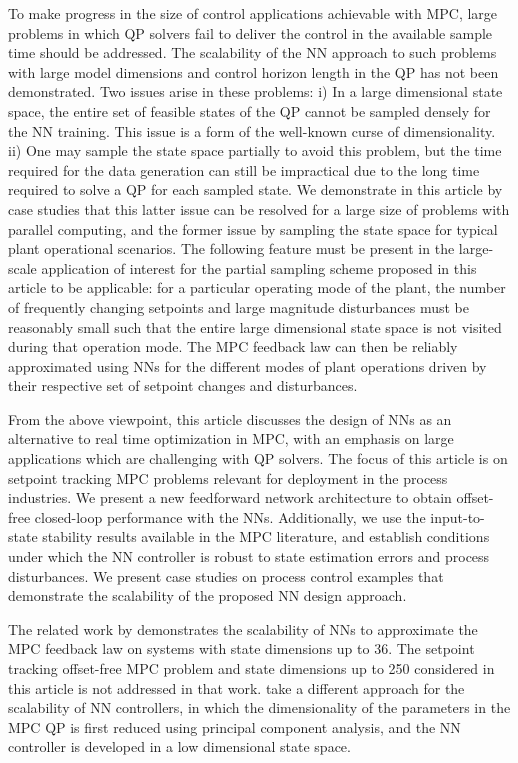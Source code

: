 \documentclass[preprint,5p, twocolumn, authoryear]{elsarticle}
\begin{document}
To make progress in the size of control applications achievable with MPC, large
problems in which QP solvers fail to deliver the control in the available sample
time should be addressed. The scalability of the NN approach to such problems
with large model dimensions and control horizon length in the QP has not been
demonstrated. Two issues arise in these problems: i) In a large dimensional
state space, the entire set of feasible states of the QP cannot be sampled
densely for the NN training. This issue is a form of the well-known curse of
dimensionality. ii) One may sample the state space partially to avoid this
problem, but the time required for the data generation can still be impractical
due to the long time required to solve a QP for each sampled state. We
demonstrate in this article by case studies that this latter issue can be
resolved for a large size of problems with parallel computing, and the former
issue by sampling the state space for typical plant operational scenarios. The
following feature must be present in the large-scale application of interest for
the partial sampling scheme proposed in this article to be applicable: for a
particular operating mode of the plant, the number of frequently changing
setpoints and large magnitude disturbances must be reasonably small such that
the entire large dimensional state space is not visited during that operation
mode. The MPC feedback law can then be reliably approximated using NNs for the
different modes of plant operations driven by their respective set of setpoint
changes and disturbances.

From the above viewpoint, this article discusses the design of NNs as an
alternative to real time optimization in MPC, with an emphasis on large
applications which are challenging with QP solvers. The focus of this article is
on setpoint tracking MPC problems relevant for deployment in the process
industries. We present a new feedforward network architecture to obtain
offset-free closed-loop performance with the NNs. Additionally, we use the
input-to-state stability results available in the MPC literature, and establish
conditions under which the NN controller is robust to state estimation errors
and process disturbances. We present case studies on process control examples
that demonstrate the scalability of the proposed NN design approach.

The related work by \cite*{chen:wang:atanasov:kumar:morari:2019} demonstrates
the scalability of NNs to approximate the MPC feedback law on systems with state
dimensions up to 36. The setpoint tracking offset-free MPC problem and state
dimensions up to 250 considered in this article is not addressed in that work. 
\cite*{drgona:picard:kvasnica:helsen:2018}
take a different approach for the scalability of NN controllers, in which the
dimensionality of the parameters in the MPC QP is first reduced using principal
component analysis, and the NN controller is developed in a low dimensional
state space.
\end{document}
